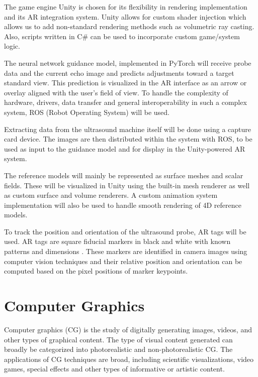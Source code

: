\documentclass{article}
\begin{document}
The game engine Unity \cite{unity2025} is chosen for its flexibility in rendering implementation and its AR integration system.
Unity allows for custom shader injection \cite{unityShaders2025} which allows us to add non-standard rendering methods such as 
volumetric ray casting. Also, scripts written in C\# can be used to incorporate custom game/system logic.

The neural network guidance model, implemented in PyTorch \cite{paszke2019pytorch} will receive probe data and the current echo image and predicts adjustments toward a target standard view. 
This prediction is visualized in the AR interface as an arrow or overlay aligned with the user's field of view.
To handle the complexity of hardware, drivers, data transfer and general interoperability in such a complex system, 
ROS (Robot Operating System) \cite{quigley2009ros} will be used.

Extracting data from the ultrasound machine itself will be done using a capture card device.
The images are then distributed within the system with ROS, to be used as input to the guidance model
and for display in the Unity-powered AR system.

The reference models will mainly be represented as surface meshes and scalar fields. These will
be visualized in Unity using the built-in mesh renderer as well as custom surface and volume renderers.
A custom animation system implementation will also be used to handle smooth rendering of 4D reference models.

To track the position and orientation of the ultrasound probe, AR tags will be used.
AR tags are square fiducial markers in black and white with known patterns and dimensions \cite{nrc_artag}. These markers
are identified in camera images using computer vision techniques and their relative position and orientation
can be computed based on the pixel positions of marker keypoints.






\section{Computer Graphics}
Computer graphics (CG) is the study of digitally generating images, videos, and other types of graphical content.
The type of visual content generated can broadly be categorized into photorealistic and non-photorealistic CG.
The applications of CG techniques are broad, including scientific visualizations, video games, special effects and other types of informative or artistic content.
\end{document}
